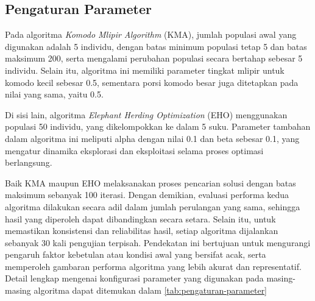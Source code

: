 \subsection{Pengaturan Parameter}
Pada algoritma \textit{Komodo Mlipir Algorithm} (KMA), jumlah populasi awal yang digunakan adalah 5 individu, dengan batas minimum populasi tetap 5 dan batas maksimum 200, serta mengalami perubahan populasi secara bertahap sebesar 5 individu. Selain itu, algoritma ini memiliki parameter tingkat mlipir untuk komodo kecil sebesar 0.5, sementara porsi komodo besar juga ditetapkan pada nilai yang sama, yaitu 0.5.

Di sisi lain, algoritma \textit{Elephant Herding Optimization} (EHO) menggunakan populasi 50 individu, yang dikelompokkan ke dalam 5 suku. Parameter tambahan dalam algoritma ini meliputi alpha dengan nilai 0.1 dan beta sebesar 0.1, yang mengatur dinamika eksplorasi dan eksploitasi selama proses optimasi berlangsung.

Baik KMA maupun EHO melaksanakan proses pencarian solusi dengan batas maksimum sebanyak 100 iterasi. Dengan demikian, evaluasi performa kedua algoritma dilakukan secara adil dalam jumlah perulangan yang sama, sehingga hasil yang diperoleh dapat dibandingkan secara setara. Selain itu, untuk memastikan konsistensi dan reliabilitas hasil, setiap algoritma dijalankan sebanyak 30 kali pengujian terpisah. Pendekatan ini bertujuan untuk mengurangi pengaruh faktor kebetulan atau kondisi awal yang bersifat acak, serta memperoleh gambaran performa algoritma yang lebih akurat dan representatif. Detail lengkap mengenai konfigurasi parameter yang digunakan pada masing-masing algoritma dapat ditemukan dalam \cref{tab:pengaturan-parameter}

